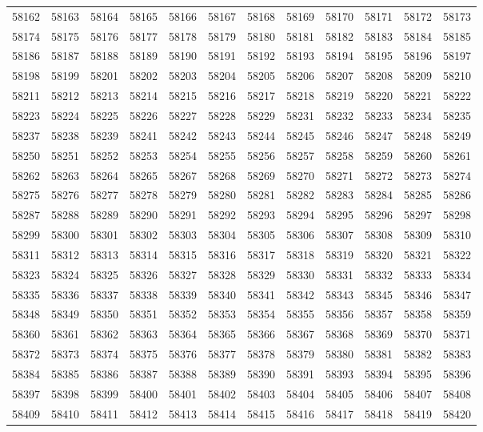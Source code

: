 \begin{center}
\begin{longtable}{llllllllllll}
58162 &58163 &58164 &58165 &58166 &58167 &58168 &58169 &58170 &58171 &58172 &58173 \\
58174 &58175 &58176 &58177 &58178 &58179 &58180 &58181 &58182 &58183 &58184 &58185 \\
58186 &58187 &58188 &58189 &58190 &58191 &58192 &58193 &58194 &58195 &58196 &58197 \\
58198 &58199 &58201 &58202 &58203 &58204 &58205 &58206 &58207 &58208 &58209 &58210 \\
58211 &58212 &58213 &58214 &58215 &58216 &58217 &58218 &58219 &58220 &58221 &58222 \\
58223 &58224 &58225 &58226 &58227 &58228 &58229 &58231 &58232 &58233 &58234 &58235 \\
58237 &58238 &58239 &58241 &58242 &58243 &58244 &58245 &58246 &58247 &58248 &58249 \\
58250 &58251 &58252 &58253 &58254 &58255 &58256 &58257 &58258 &58259 &58260 &58261 \\
58262 &58263 &58264 &58265 &58267 &58268 &58269 &58270 &58271 &58272 &58273 &58274 \\
58275 &58276 &58277 &58278 &58279 &58280 &58281 &58282 &58283 &58284 &58285 &58286 \\
58287 &58288 &58289 &58290 &58291 &58292 &58293 &58294 &58295 &58296 &58297 &58298 \\
58299 &58300 &58301 &58302 &58303 &58304 &58305 &58306 &58307 &58308 &58309 &58310 \\
58311 &58312 &58313 &58314 &58315 &58316 &58317 &58318 &58319 &58320 &58321 &58322 \\
58323 &58324 &58325 &58326 &58327 &58328 &58329 &58330 &58331 &58332 &58333 &58334 \\
58335 &58336 &58337 &58338 &58339 &58340 &58341 &58342 &58343 &58345 &58346 &58347 \\
58348 &58349 &58350 &58351 &58352 &58353 &58354 &58355 &58356 &58357 &58358 &58359 \\
58360 &58361 &58362 &58363 &58364 &58365 &58366 &58367 &58368 &58369 &58370 &58371 \\
58372 &58373 &58374 &58375 &58376 &58377 &58378 &58379 &58380 &58381 &58382 &58383 \\
58384 &58385 &58386 &58387 &58388 &58389 &58390 &58391 &58393 &58394 &58395 &58396 \\
58397 &58398 &58399 &58400 &58401 &58402 &58403 &58404 &58405 &58406 &58407 &58408 \\
58409 &58410 &58411 &58412 &58413 &58414 &58415 &58416 &58417 &58418 &58419 &58420 \\

\end{longtable}
\end{center}
